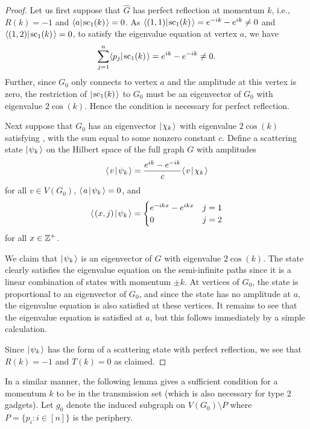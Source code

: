 \documentclass[../thesis-main/thesis-main]{subfiles}
\begin{document}
\begin{proof}
Let us first suppose that $\widehat{G}$ has perfect reflection at momentum $k$, i.e., $R(k)=-1$ and $\langle{a}|\mspace{2mu} \text{sc}_{1} (k) \mspace{2mu} \rangle=0$. As $\langle{(1,1)}|\mspace{2mu} \text{sc}_1(k) \mspace{2mu} \rangle = e^{-ik} - e^{ik}\neq 0$ and $\langle{(1,2)}|\mspace{2mu} \text{sc}_1(k) \mspace{2mu} \rangle=0$, to satisfy the eigenvalue equation at vertex $a$, we have
\begin{equation}
  \sum_{j=1}^{n} \langle{p_j}|\mspace{2mu} \text{sc}_1(k) \mspace{2mu} \rangle = e^{ik} - e^{-ik} \neq 0.
\end{equation}
Further, since $G_0$ only connects to vertex $a$ and the amplitude at this vertex is zero, the restriction of $|\mspace{2mu} \text{sc}_1(k) \mspace{2mu} \rangle$ to $G_0$ must be an eigenvector of $G_0$ with eigenvalue $2\cos(k)$. Hence the condition is necessary for perfect reflection. 
 
Next suppose that $G_0$ has an eigenvector $|\mspace{2mu} \chi_k \mspace{2mu} \rangle$ with eigenvalue $2\cos(k)$ satisfying , with the sum equal to some nonzero constant $c$. Define a scattering state $|\mspace{2mu} \psi_k \mspace{2mu} \rangle$ on the Hilbert space of the full graph $G$ with amplitudes
\begin{equation}
  \langle\mspace{2mu} v \mspace{2mu} | \mspace{2mu} \psi_k\mspace{2mu} \rangle = \frac{e^{ik} - e^{-ik}}{c} \langle\mspace{2mu} v \mspace{2mu} | \mspace{2mu} \chi_k\mspace{2mu} \rangle
\end{equation}
for all $v \in V(G_0)$, $\langle\mspace{2mu} a \mspace{2mu} | \mspace{2mu} \psi_k\mspace{2mu} \rangle=0$, and 
\begin{equation}
 \langle\mspace{2mu} (x,j) \mspace{2mu} | \mspace{2mu} \psi_k\mspace{2mu} \rangle=\begin{cases} e^{-ikx}-e^{ikx} & j=1\\
0 & j=2
\end{cases}
\end{equation}
for all $x \in \mathbb{Z}^+$.

We claim that $|\mspace{2mu} \psi_k \mspace{2mu} \rangle$ is an eigenvector of $G$ with eigenvalue $2 \cos(k)$.  The state clearly satisfies the eigenvalue equation on the semi-infinite paths since it is a linear combination of states with momentum $\pm k$.  At vertices of $G_0$, the state is proportional to an eigenvector of $G_0$, and since the state has no amplitude at $a$, the eigenvalue equation is also satisfied at these vertices.  It remains to see that the eigenvalue equation is satisfied at $a$, but this follows immediately by a simple calculation.

Since $|\mspace{2mu} \psi_k \mspace{2mu} \rangle$ has the form of a scattering state with perfect reflection, we see that $R(k)=-1$ and $T(k)=0$ as claimed.
\end{proof}

In a similar manner, the following lemma gives a sufficient condition for a momentum $k$ to be in the transmission set (which is also necessary for type 2 gadgets).  Let $g_0$ denote the induced subgraph on $V(G_0)\setminus P$ where $P = \{p_i\colon i\in [n]\}$ is the periphery.
\end{document}
